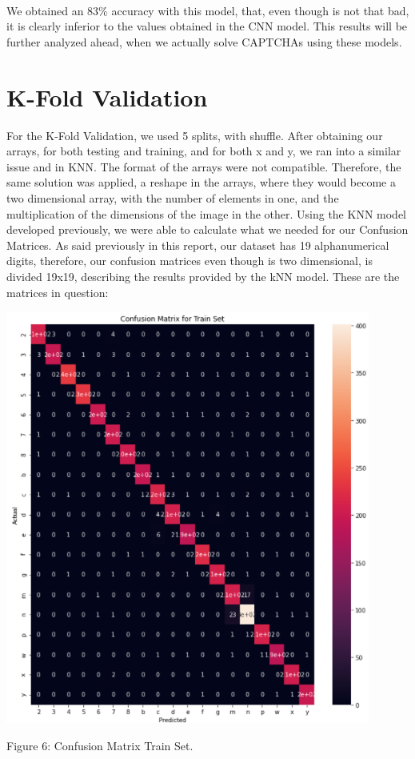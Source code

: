 \documentclass[conference]{IEEEtran}
\begin{document}
\\ \\ \\
We obtained an 83\% accuracy with this model, that, even though is not that bad, it is clearly inferior to the values obtained in the CNN model. This results will be further analyzed ahead, when we actually solve CAPTCHAs using these models. 

\section{K-Fold Validation}
For the K-Fold Validation, we used 5 splits, with shuffle. After obtaining our arrays, for both testing and training, and for both x and y, we ran into a similar issue and in KNN. The format of the arrays were not compatible. Therefore, the same solution was applied, a reshape in the arrays, where they would become a two dimensional array, with the number of elements in one, and the multiplication of the dimensions of the image in the other. Using the KNN model developed previously, we were able to calculate what we needed for our Confusion Matrices. As said previously in this report, our dataset has 19 alphanumerical digits, therefore, our confusion matrices even though is two dimensional, is divided 19x19, describing the results provided by the kNN model. These are the matrices in question: 
\begin{center}
\includegraphics[scale=0.55]{confusionmatrix.png}
\caption{Figure 6: Confusion Matrix Train Set.}
\end{center}
\end{document}
